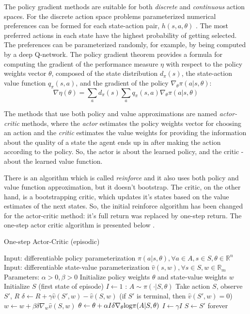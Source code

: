 The policy gradient methods are suitable for both \textit{discrete} and \textit{continuous} action spaces. For the discrete action space problems parameterized numerical preferences can be formed for each state-action pair, $h(s,a,\theta)$ \cite{Sutton}. The most preferred actions in each state have the highest probability of getting selected. The preferences can be parameterized randomly, for example, by being computed by a deep Q-network. The policy gradient theorem provides a formula for computing the gradient of the performance measure $\eta$ with respect to the policy weights vector $\theta$, composed of the state distribution $d_{\pi}(s)$, the state-action value function $q_{\pi}(s,a)$, and the gradient of the policy $\nabla_{\theta}\pi(a|s,\theta)$:
\begin{equation}\label{gradMTheorem}
\nabla\eta(\theta)=\sum_{a}d_{\pi}(s)\sum_{a}q_{\pi}(s,a)\nabla_{\theta}\pi(a|s,\theta)
\end{equation}

The methods that use both policy and value approximations are named \textit{actor-critic} methods, where the \textit{actor} estimates the policy weights vector for choosing an action and the \textit{critic} estimates the value weights for providing the information about the quality of a state the agent ends up in after making the action according to the policy. So, the actor is about the learned policy, and the critic - about the learned value function. 

There is an algorithm which is called \textit{reinforce} and it also uses both policy and value function approximation, but it doesn't bootstrap. The critic, on the other hand, is a bootstrapping critic, which updates it's states based on the value estimates of the next states. So, the initial reinforce algorithm has been changed for the actor-critic method: it's full return was replaced by one-step return. The one-step actor critic algorithm is presented below \cite{Sutton}.
\begin{algorithm}[H]
	\caption{One-step Actor-Critic (episodic)}
	\label{algo:AC}
	\begin{algorithmic}
		\State Input: differentiable policy parameterization $\pi(a|s,\theta),\forall a\in A, s\in S,\theta\in\mathbb{R}^{n}$
		\State Input: differentiable state-value parameterization $\hat{v}(s,w),\forall s \in S, w \in \mathbb{R}_{m}$
		\State Parameters: $\alpha>0,\beta>0$
		\State Initialize policy weights $\theta$ and state-value weights $w$
		\Repeat
		\State Initialize $S$ (first state of episode)
		\State $I\leftarrow 1$
		:
		\State $A\sim \pi(\cdot|S,\theta)$
		\State Take action $S$, observe $S'$, $R$
		\State $\delta\leftarrow R+\gamma\hat{v}(S',w)-\hat{v}(S,w)$ (if $S'$ is terminal, then $\hat{v}(S',w)=0$)
		\State $w\leftarrow w+\beta\delta\nabla_{w}\hat{v}(S,w)$
		\State $\theta\leftarrow \theta+\alpha I \delta\nabla_{\theta} \textup{log} \pi(A|S,\theta)$
		\State $I\leftarrow \gamma I$
		\State $S\leftarrow S'$
		\EndWhile
		\Until forever
	\end{algorithmic}
\end{algorithm}

